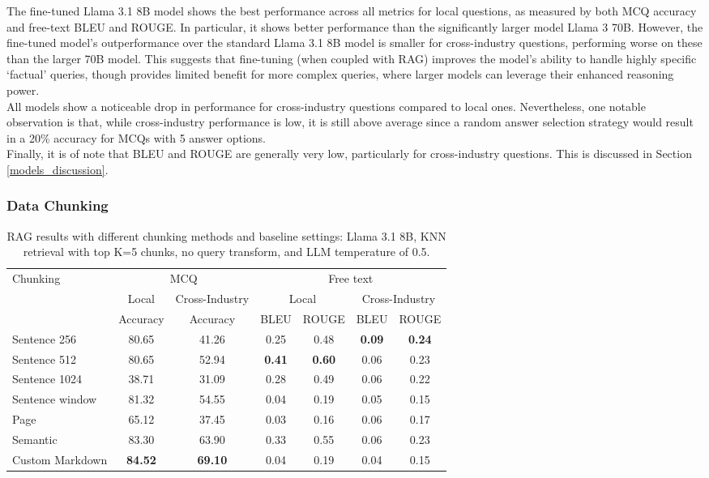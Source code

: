 The fine-tuned Llama 3.1 8B model shows the best performance across all metrics for local questions, as measured by both MCQ accuracy and free-text BLEU and ROUGE. In particular, it shows better performance than the significantly larger model Llama 3 70B. However, the fine-tuned model's outperformance over the standard Llama 3.1 8B model is smaller for cross-industry questions, performing worse on these than the larger 70B model. This suggests that fine-tuning (when coupled with RAG) improves the model's ability to handle highly specific `factual' queries, though provides limited benefit for more complex queries, where larger models can leverage their enhanced reasoning power.\\

All models show a noticeable drop in performance for cross-industry questions compared to local ones. Nevertheless, one notable observation is that, while cross-industry performance is low, it is still above average since a random answer selection strategy would result in a 20\% accuracy for MCQs with 5 answer options.\\

Finally, it is of note that BLEU and ROUGE are generally very low, particularly for cross-industry questions. This is discussed in Section \ref{models_discussion}.
 

\subsubsection{Data Chunking}\label{chunking_results}


\begin{table}[H]
\centering
\begin{tabular}{lcccccc}
\hline
\multirow{3}{*}{Chunking} & \multicolumn{2}{c}{MCQ} & \multicolumn{4}{c}{Free text} \\ \cline{2-7} 
 & Local & Cross-Industry & \multicolumn{2}{c}{Local} & \multicolumn{2}{c}{Cross-Industry} \\   
 & Accuracy & Accuracy & BLEU & ROUGE & BLEU & ROUGE \\ \hline
Sentence 256    & 80.65 & 41.26 & 0.25 & 0.48 & \textbf{0.09} & \textbf{0.24} \\
Sentence 512    & 80.65 & 52.94 & \textbf{0.41} & \textbf{0.60} & 0.06 & 0.23 \\
Sentence 1024   & 38.71 & 31.09 & 0.28 & 0.49 & 0.06 & 0.22 \\
Sentence window & 81.32 & 54.55 & 0.04 & 0.19 & 0.05 & 0.15 \\
Page            & 65.12 & 37.45 & 0.03 & 0.16 & 0.06 & 0.17 \\
Semantic        & 83.30 & 63.90 & 0.33 & 0.55 & 0.06 & 0.23 \\
Custom Markdown & \textbf{84.52} & \textbf{69.10} & 0.04 & 0.19 & 0.04 & 0.15 \\ \hline
\end{tabular}
\caption{RAG results with different chunking methods and baseline settings: Llama 3.1 8B, KNN retrieval with top K=5 chunks, no query transform, and LLM temperature of 0.5.}
\label{tab:chunking}
\end{table}


